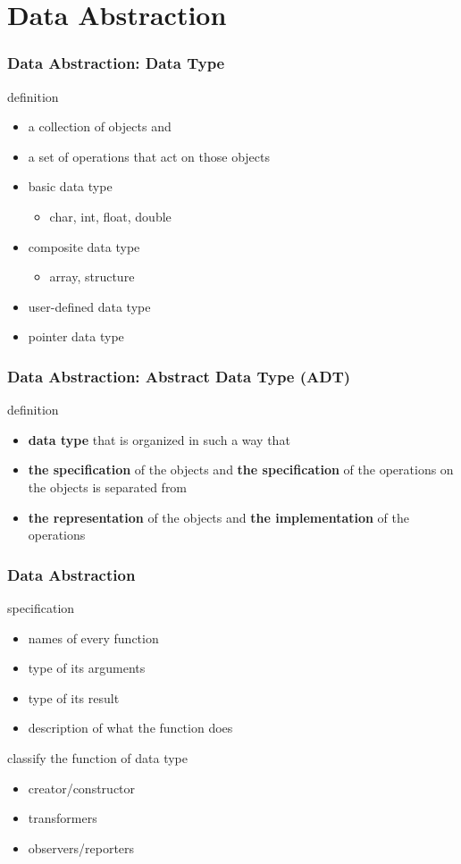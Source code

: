\documentclass[newPxFont,sthlmFooter,nooffset]{beamer}
\begin{document}
\section{Data Abstraction}
\begin{frame}[t]
  \frametitle{Data Abstraction: Data Type}
definition
\begin{itemize}
\item a collection of objects and
\item a set of operations that act on
  those objects
\end{itemize}

\begin{itemize}
\item basic data type
  \begin{itemize}
  \item char, int, float, double
  \end{itemize}

\item composite data type
  \begin{itemize}
  \item array, structure
  \end{itemize}
\item user-defined data type
\item pointer data type
\end{itemize}

\end{frame}

\begin{frame}[t]
  \frametitle{Data Abstraction: Abstract Data Type (ADT)}
definition
\begin{itemize}
\item \textbf{data type} that is organized in such a way that
\item \textbf{the specification} of the objects and \textbf{the specification} of the operations on the objects is separated from
\item  \textbf{the representation} of the objects and \textbf{the implementation} of the operations
\end{itemize}


\end{frame}

\begin{frame}[t]
  \frametitle{Data Abstraction}
specification
\begin{itemize}
\item  names of every function
\item type of its arguments
\item type of its result
\item description of what the function does
\end{itemize}

classify the function of data type 
\begin{itemize}
\item creator/constructor
\item transformers
\item observers/reporters
\end{itemize}

\end{frame}
\end{document}
